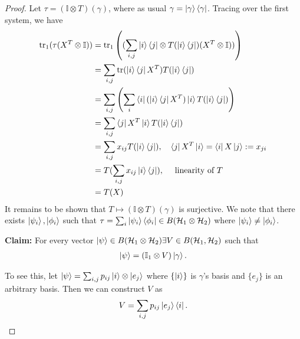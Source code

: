 \documentclass[../../note.tex]{subfiles}
\begin{document}
\begin{tcolorbox}[colframe=black,breakable, colback=black!5, arc=0pt, outer arc=0pt,boxrule=0.5pt]
\begin{proof}
Let $\tau = (\mathbb{I}\otimes T)(\gamma)$, where as usual $\gamma=\ket{\gamma}\bra{\gamma}$. Tracing over the first system, we have \begin{align}
    \text{tr}_1(\tau(X^{T}\otimes \mathbb{I})) &= \text{tr}_1\left((\sum_{i,j}\ket{i}\bra{j}\otimes T(\ket{i}\bra{j})(X^{T}\otimes \mathbb{I}))\right)\\
    &= \sum_{i,j} \text{tr}(\ket{i}\bra{j}X^T) T(\ket{i}\bra{j})\\
    &=\sum_{i,j} \left(\sum_{i}\bra{i}(\ket{i}\bra{j}X^T)\ket{i} T(\ket{i}\bra{j})\right)\\
    &=\sum_{i,j} \bra{j}X^T\ket{i} T(\ket{i}\bra{j})\\
    &=\sum_{i,j} x_{ij} T(\ket{i}\bra{j}), \quad\bra{j}X^T\ket{i}=\bra{i}X\ket{j}:=x_{ji}\\
    &= T(\sum_{i,j} x_{ij}\ket{i}\bra{j}), \quad \text{ linearity of } T\\
    &= T(X)
\end{align}
It remains to be shown that $T\mapsto (\mathbb{I} \otimes T)(\gamma)$ is surjective. We note that there exists $\ket{\psi_i},\ket{\phi_i}$ such that $\tau = \sum_i \ket{\psi_i}\bra{\phi_i} \in B(\mathcal{H}_1 \otimes \mathcal{H}_2)$ where $\ket{\psi_i} \neq \ket{\phi_i}$.

\vspace{1cm}
\noindent \textbf{Claim:} For every vector $\ket{\psi}\in B(\mathcal{H}_1 \otimes \mathcal{H}_2) \exists V\in B(\mathcal{H}_1,\mathcal{H}_2)$ such that 
\begin{align}
    \ket{\psi} =(\mathbb{I}_1 \otimes V)\ket{\gamma}.
\end{align}

To see this, let $\ket{\psi}=\sum_{i,j}p_{ij} \ket{i}\otimes \ket{e_j}$ where $\{\ket{i}\}$ is $\gamma$'s basis and $\{e_j\}$ is an arbitrary basis. Then we can construct $V$ as
\begin{align}
    V=\sum_{i,j} p_{ij} \ket{e_j}\bra{i}.
\end{align}


\end{proof}
\end{tcolorbox}
\end{document}
